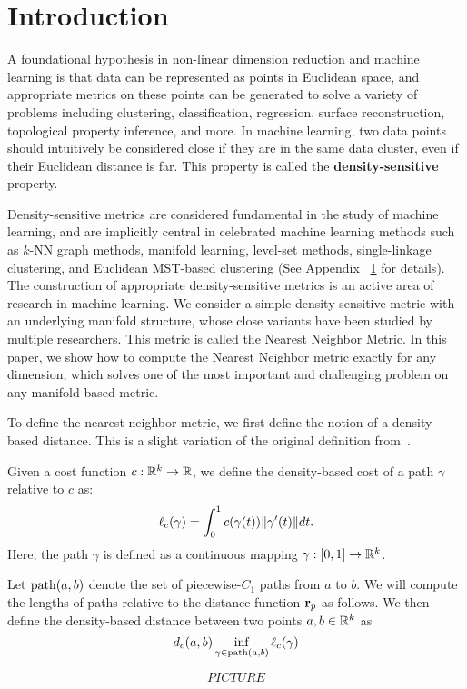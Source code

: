 \section{Introduction} A foundational hypothesis in non-linear dimension
reduction and machine learning is that data can be represented as points in
Euclidean space, and appropriate metrics on these points can be generated
to solve a variety of problems including clustering, classification,
regression, surface reconstruction, topological property inference, and
more. In machine learning, two data points should intuitively be considered
close if they are in the same data cluster, even if their Euclidean
distance is far. This property is called the \textbf{density-sensitive}
property.

Density-sensitive metrics are considered fundamental in the study of
machine learning, and are implicitly central in celebrated machine learning
methods such as $k$-NN graph methods, manifold learning, level-set methods,
single-linkage clustering, and Euclidean MST-based clustering (See Appendix
~\ref{} for details). The construction of appropriate density-sensitive
metrics is an active area of research in machine learning. We consider a
simple density-sensitive metric with an underlying manifold structure,
whose close variants have been studied by multiple researchers. This metric
is called the Nearest Neighbor Metric.  In this paper, we show how to
compute the Nearest Neighbor metric exactly for any dimension, which solves
one of the most important and challenging problem on any manifold-based
metric.

To define the nearest neighbor metric, we first define the notion of a
density-based distance. This is a slight variation of the original
definition from~\cite{}.

\begin{definition}
Given a cost function $c:\mathbb{R}^k \rightarrow \mathbb{R}$, we define the density-based
cost of a path $\gamma$ relative to $c$ as: 
\[ \ell_c(\gamma) = \int_{0}^1 c(\gamma(t)) \| \gamma'(t) \|dt. \]
Here, the path $\gamma$ is defined as a continuous mapping $\gamma:[0,1]
\to \mathbb{R}^k$.

Let $\mathrm{path}(a,b)$ denote the set
of piecewise-$C_1$ paths from $a$ to $b$.  We will compute the
lengths of paths relative to the distance function $\mathbf{r}_p$ as
follows. 
We then define the density-based distance between two points $a, b \in
\mathbb{R}^k$ as 
\[ d_c(a,b) \inf_{\gamma\in\mathrm{path}(a,b)} \ell_c(\gamma)\]
\end{definition} $$PICTURE$$

